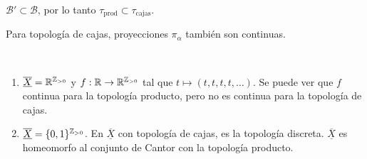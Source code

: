 \documentclass[a4paper]{report}
\begin{document}
\begin{corollary}
	$\mathcal{B}' \subset \mathcal{B}$, por lo tanto $\tau_{\text{prod}} \subset \tau_{\text{cajas}}$.
\end{corollary}

\begin{corollary}
	Para topología de cajas, proyecciones $\pi_{\alpha}$ también son continuas.
\end{corollary}

\begin{eg}~
	\begin{enumerate}
		\item $\underline{\overline{X}} = \mathbb{R}^{\mathbb{Z}_{>0}}$ y $f : \mathbb{R} \to \mathbb{R}^{\mathbb{Z}_{>0}}$ tal que $t \mapsto (t,t,t,t,\dots)$. Se puede ver que $f$ continua para la topología producto, pero no es continua para la topología de cajas.

		\item $\underline{\overline{X}} = \{ 0,1 \}^{\mathbb{Z}_{>0}}$. En $\underline{\overline{X}}$ con topología de cajas, es la topología discreta. $\underline{\overline{X}}$ es homeomorfo al conjunto de Cantor con la topología producto.  
	\end{enumerate}
\end{eg}



\end{document}

